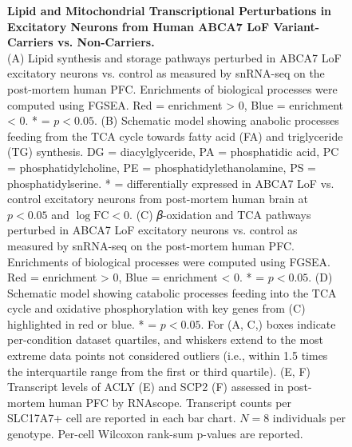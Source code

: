 \renewcommand{\thefigure}{S\arabic{figure}}

\clearpage

\clearpage


\clearpage


\clearpage


\clearpage

\clearpage

\clearpage

\clearpage


\begin{figure}[ht]
    \caption{
        \textbf{Lipid and Mitochondrial Transcriptional Perturbations in Excitatory Neurons from Human ABCA7 LoF Variant-Carriers vs. Non-Carriers.}\\[1ex]
        (A) Lipid synthesis and storage pathways perturbed in ABCA7 LoF excitatory neurons vs. control as measured by snRNA-seq on the post-mortem human PFC. Enrichments of biological processes were computed using FGSEA. Red = enrichment > 0, Blue = enrichment < 0. * = $p<0.05$. 
        (B) Schematic model showing anabolic processes feeding from the TCA cycle towards fatty acid (FA) and triglyceride (TG) synthesis. DG = diacylglyceride, PA = phosphatidic acid, PC = phosphatidylcholine, PE = phosphatidylethanolamine, PS = phosphatidylserine. * = differentially expressed in ABCA7 LoF vs. control excitatory neurons from post-mortem human brain at $p<0.05$ and $\log\text{FC}<0$. 
        (C) 𝛽-oxidation and TCA pathways perturbed in ABCA7 LoF excitatory neurons vs. control as measured by snRNA-seq on the post-mortem human PFC. Enrichments of biological processes were computed using FGSEA. Red = enrichment > 0, Blue = enrichment < 0. * = $p<0.05$. 
        (D) Schematic model showing catabolic processes feeding into the TCA cycle and oxidative phosphorylation with key genes from (C) highlighted in red or blue. * = $p<0.05$. For (A, C,) boxes indicate per-condition dataset quartiles, and whiskers extend to the most extreme data points not considered outliers (i.e., within 1.5 times the interquartile range from the first or third quartile). 
        (E, F) Transcript levels of ACLY (E) and SCP2 (F) assessed in post-mortem human PFC by RNAscope. Transcript counts per SLC17A7+ cell are reported in each bar chart. $N = 8$ individuals per genotype. Per-cell Wilcoxon rank-sum p-values are reported.
    }
    \label{fig:lipid_mitochondrial_perturbations}
\end{figure}

